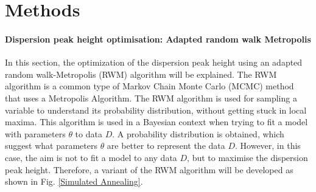 \chapter{Methods}
%
%

\subsubsection{Dispersion peak height optimisation: Adapted random walk Metropolis}
In this section, the optimization of the dispersion peak height using an adapted random walk-Metropolis (RWM) algorithm will be explained.
The RWM algorithm is a common type of Markov Chain Monte Carlo (MCMC) method that uses a Metropolis Algorithm.
The RWM algorithm is used for sampling a variable to understand its probability distribution, without getting stuck in local maxima.
This algorithm is used in a Bayesian context when trying to fit a model with parameters $\theta$ to data $D$.
A probability distribution is obtained, which suggest what parameters $\theta$ are better to represent the data $D$.
However, in this case, the aim is not to fit a model to any data $D$, but to maximise the dispersion peak height.
Therefore, a variant of the RWM algorithm will be developed as shown in Fig. \ref{Simulated Annealing}.

